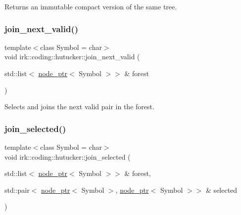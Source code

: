 Returns an immutable compact version of the same tree. 

\mbox{\label{namespaceirk_1_1coding_1_1hutucker_ad43136697500a2cc05315ab694767d84}} 
\subsubsection{\texorpdfstring{join\+\_\+next\+\_\+valid()}{join\_next\_valid()}}
{\footnotesize\ttfamily template$<$class Symbol  = char$>$ \\
void irk\+::coding\+::hutucker\+::join\+\_\+next\+\_\+valid (\begin{DoxyParamCaption}\item[{std\+::list$<$ \mbox{\hyperlink{namespaceirk_1_1coding_1_1hutucker_aa5d22cfdf05ffec38f2531e0307248fe}{node\+\_\+ptr}}$<$ Symbol $>$$>$ \&}]{forest }\end{DoxyParamCaption})}



Selects and joins the next valid pair in the forest. 

\mbox{\label{namespaceirk_1_1coding_1_1hutucker_a3cce9468fb0b4bd0b2f30422b8c00284}} 
\subsubsection{\texorpdfstring{join\+\_\+selected()}{join\_selected()}}
{\footnotesize\ttfamily template$<$class Symbol  = char$>$ \\
void irk\+::coding\+::hutucker\+::join\+\_\+selected (\begin{DoxyParamCaption}\item[{std\+::list$<$ \mbox{\hyperlink{namespaceirk_1_1coding_1_1hutucker_aa5d22cfdf05ffec38f2531e0307248fe}{node\+\_\+ptr}}$<$ Symbol $>$$>$ \&}]{forest,  }\item[{std\+::pair$<$ \mbox{\hyperlink{namespaceirk_1_1coding_1_1hutucker_aa5d22cfdf05ffec38f2531e0307248fe}{node\+\_\+ptr}}$<$ Symbol $>$, \mbox{\hyperlink{namespaceirk_1_1coding_1_1hutucker_aa5d22cfdf05ffec38f2531e0307248fe}{node\+\_\+ptr}}$<$ Symbol $>$$>$ \&}]{selected }\end{DoxyParamCaption})}



